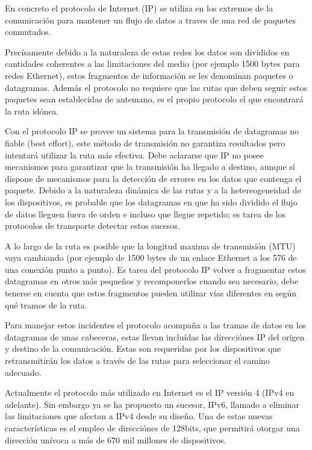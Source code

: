 \documentclass[a4paper,spanish,12pt]{book}
\begin{document}
En concreto el protocolo de Internet (IP) se utiliza en los extremos de la comunicación para mantener un flujo de datos a traves de una red de paquetes conmutados.

Precísamente debido a la naturaleza de estas redes los datos son divididos en cantidades coherentes a las limitaciones del medio (por ejemplo 1500 bytes para redes Ethernet), estos fragmentos de información se les denominan paquetes o datagramas. Además el protocolo no requiere que las rutas que deben seguir estos paquetes sean establecidas de antemano, es el propio protocolo el que encontrará la ruta idónea.

Con el protocolo IP se provee un sistema para la transmisión de datagramas no fiable (best effort), este m\'etodo de transmisión no garantiza resultados pero intentará utilizar la ruta más efectiva. Debe aclararse que IP no posee mecanismos para garantizar que la transmisión ha llegado a destino, aunque sí dispone de mecanismos para la detección de errores en los datos que contenga el paquete. Debido a la naturaleza dinámica de las rutas y a la hetereogeneidad de los dispositivos, es probable que los datagramas en que ha sido dividido el flujo de datos lleguen fuera de orden e incluso que llegue repetido; es tarea de los protocolos de transporte detectar estos sucesos.

A lo largo de la ruta es posible que la longitud maxima de transmisión (MTU) vaya cambiando (por ejemplo de 1500 bytes de un enlace Ethernet a los 576 de una conexión punto a punto). Es tarea del protocolo IP volver a fragmentar estos datagramas en otros más pequeños y recomponerlos cuando sea necesario, debe tenerse en cuenta que estos fragmentos pueden utilizar vías diferentes en según qué tramos de la ruta.

Para manejar estos incidentes el protocolo acompaña a las tramas de datos en los datagramas de unas cabeceras, estas llevan incluídas las direcciónes IP del origen y destino de la comunicación. Estas son requeridas por los dispositivos que retransmitirán los datos a trav\'es de las rutas para seleccionar el camino adecuado.

Actualmente el protocolo más utilizado en Internet es el IP versión 4 (IPv4 en adelante). Sin embargo ya se ha propuesto un sucesor, IPv6, llamado a eliminar las limitaciones que afectan a IPv4 desde su diseño. Una de estas nuevas características es el empleo de direcciónes de 128bits, que permitirá otorgar una dirección unívoca a más de 670 mil millones de dispositivos. 
\end{document}
